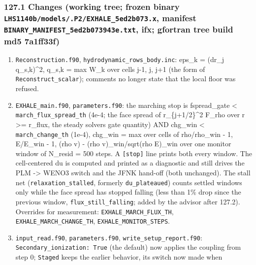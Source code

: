 \documentclass[english,a4paper]{my_memo}
\providecommand{\tightlist}{\setlength{\itemsep}{0pt}\setlength{\parskip}{0pt}}
\begin{document}
\subsubsection{\texorpdfstring{127.1 Changes (working tree; frozen binary \texttt{LHS1140b/models/.P2/EXHALE\_5ed2b073.x}, manifest \texttt{BINARY\_MANIFEST\_5ed2b073943e.txt}, ifx; gfortran tree build md5 7a1ff33f)}{127.1 Changes (working tree; frozen binary LHS1140b/models/.P2/EXHALE\_5ed2b073.x, manifest BINARY\_MANIFEST\_5ed2b073943e.txt, ifx; gfortran tree build md5 7a1ff33f)}}\label{1271-changes-working-tree-frozen-binary-lhs1140bmodelsp2exhale_5ed2b073x-manifest-binary_manifest_5ed2b073943etxt-ifx-gfortran-tree-build-md5-7a1ff33f}

\begin{enumerate}
\def\labelenumi{\arabic{enumi}.}
\tightlist
\item
  \texttt{Reconstruction.f90}, \texttt{hydrodynamic\_rows\_body.inc}: eps\_k = (dr\_j q\_s,k)\^{}2,
  q\_s,k = max \textbar W\_k\textbar{} over cells j-1, j, j+1 (the form of \texttt{Reconstruct\_scalar});
  comments no longer state that the local floor was refused.
\item
  \texttt{EXHALE\_main.f90}, \texttt{parameters.f90}: the marching stop is
  fspread\_gate \textless{} \texttt{march\_flux\_spread\_th} (4e-4; the face spread of
  r\_\{j+1/2\}\^{}2 F\_rho over r \textgreater= r\_flux, the steady solvers\textquotesingle{} gate quantity) AND
  chg\_win \textless{} \texttt{march\_change\_th} (1e-4), chg\_win = max over cells of
  \textbar rho/rho\_win - 1\textbar, \textbar E/E\_win - 1\textbar, \textbar(rho v) - (rho v)\_win\textbar/sqrt(rho E)\_win
  over one monitor window of N\_resid = 500 steps. A \texttt{{[}stop{]}} line prints both
  every window. The cell-centered du is computed and printed as a diagnostic
  and still drives the PLM -\textgreater{} WENO3 switch and the JFNK hand-off (both
  unchanged). The stall net (\texttt{relaxation\_stalled}, formerly \texttt{du\_plateaued})
  counts settled windows only while the face spread has stopped falling
  (less than 1\% drop since the previous window, \texttt{flux\_still\_falling}; added
  by the advisor after 127.2). Overrides for measurement:
  \texttt{EXHALE\_MARCH\_FLUX\_TH}, \texttt{EXHALE\_MARCH\_CHANGE\_TH}, \texttt{EXHALE\_MONITOR\_STEPS}.
\item
  \texttt{input\_read.f90}, \texttt{parameters.f90}, \texttt{write\_setup\_report.f90}:
  \texttt{Secondary\_ionization:\ True} (the default) now applies the coupling from
  step 0; \texttt{Staged} keeps the earlier behavior, its switch now made when

\end{enumerate}
\end{document}
